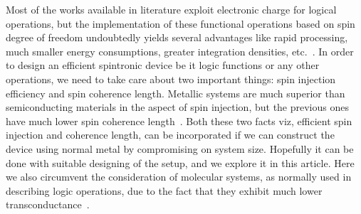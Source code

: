 \documentclass[doublecol]{epl2}
\begin{document}
Most of the works available in literature exploit electronic charge for
logical operations, but the implementation of these functional operations
based on spin degree of freedom undoubtedly yields several advantages like
rapid processing, much smaller energy consumptions, greater integration 
densities, etc.~\cite{spin1,spin2}. In order to design an efficient 
spintronic device be it logic functions or any other operations, we need 
to take care about two important things: spin injection efficiency and 
spin coherence length. Metallic systems are much superior than semiconducting 
materials in the aspect of spin injection, but the previous ones have much 
lower spin coherence length~\cite{metal}. 
Both these two facts viz, efficient spin injection and coherence length,
can be incorporated if we can construct the device using normal metal
by compromising on system size. Hopefully it can be done with suitable 
designing of the setup, and we explore it in this article. Here we also
circumvent the consideration of molecular systems, as normally used in
describing logic operations, due to the fact that they exhibit much lower
transconductance~\cite{cite5}. 
\end{document}
